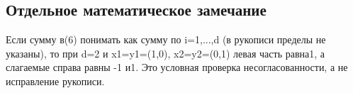 \documentclass[11pt]{article}
\theoremstyle{definition}
\theoremstyle{remark}
\begin{document}
\subsection*{Отдельное математическое замечание}\label{GELFAND-P001412-EDITORIAL-MATH-01}
Если сумму в(6) понимать как сумму по i=1,...,d (в рукописи пределы не указаны), то при d=2 и x1=y1=(1,0), x2=y2=(0,1) левая часть равна1, а слагаемые справа равны -1 и1. Это условная проверка несогласованности, а не исправление рукописи.\par
\end{document}
